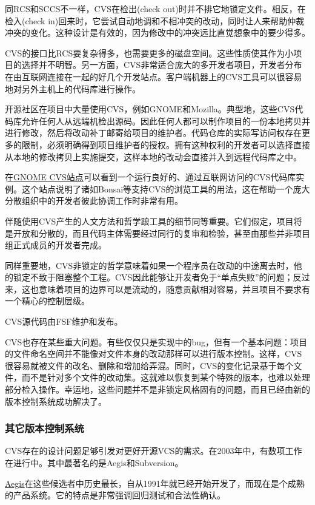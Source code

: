 \documentclass[12pt,oneside]{book}
\begin{document}
同RCS和SCCS不一样，CVS在检出(check out)时并不排它地锁定文件。相反，在检入(check in)回来时，它尝试自动地调和不相冲突的改动，同时让人来帮助仲裁冲突的变化。这种设计是有效的，因为修改中的冲突远比直觉想象中的要少得多。

CVS的接口比RCS要复杂得多，也需要更多的磁盘空间。这些性质使其作为小项目的选择并不明智。另一方面，CVS非常适合庞大的多开发者项目，开发者分布在由互联网连接在一起的好几个开发站点。客户端机器上的CVS工具可以很容易地对另外主机上的代码库进行操作。

开源社区在项目中大量使用CVS，例如GNOME和Mozilla。典型地，这些CVS代码库允许任何人从远端机检出源码。因此任何人都可以制作项目的一份本地拷贝并进行修改，然后将改动补丁邮寄给项目的维护者。代码仓库的实际写访问权存在更多的限制，必须明确得到项目维护者的授权。拥有这种权利的开发者可以选择直接从本地的修改拷贝上实施提交，这样本地的改动会直接并入到远程代码库之中。

在\href{http://cvs.gnome.org/}{GNOME CVS站点}可以看到一个运行良好的、通过互联网访问的CVS代码库实例。这个站点说明了诸如Bonsai等支持CVS的浏览工具的用法，这在帮助一个庞大分散组织中的开发者彼此协调工作时非常有用。

伴随使用CVS产生的人文方法和哲学踉工具的细节同等重要。它们假定，项目将是开放和分散的，而且代码主体需要经过同行的复审和检验，甚至由那些并非项目组正式成员的开发者完成。

同样重要地，CVS非锁定的哲学意味着如果一个程序员在改动的中途离去时，他的锁定不致于阻塞整个工程。CVS因此能够让开发者免于“单点失败”的问题；反过来，这也意味着项目的边界可以是流动的，随意贡献相对容易，并且项目不要求有一个精心的控制层级。

CVS源代码由FSF维护和发布。

CVS也存在某些重大问题。有些仅仅只是实现中的bug，但有一个基本问题：项目的文件命名空间并不能像对文件本身的改动那样可以进行版本控制。这样，CVS很容易就被文件的改名、删除和增加给弄混。同时，CVS的变化记录基于每个文件，而不是针对多个文件的改动集。这就难以恢复到某个特殊的版本，也难以处理部分检入操作。幸运地，这些问题并不是非锁定风格固有的问题，而且已经由新的版本控制系统成功解决了。

\subsubsection{其它版本控制系统}
CVS存在的设计问题足够引发对更好开源VCS的需求。在2003年中，有数项工作在进行中。其中最著名的是Aegis和Subversion。

\href{http://www.pcug.org.au/~millerp/aegis/aegis.html}{Aegis}在这些候选者中历史最长，自从1991年就已经开始开发了，而现在是个成熟的产品系统。它的特点是非常强调回归测试和合法性确认。
\end{document}

